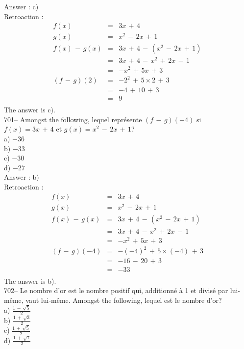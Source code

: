﻿\documentclass[letterpaper, 12pt]{article}
\begin{document}
Answer : c)\\

Retroaction : \\
\begin{eqnarray*}
f(x)&=&3x\,+\,4\\
g(x)&=&x^{2}\,-\,2x\,+\,1\\
f(x)\,-\,g(x)&=&3x\,+\,4\,-\,(x^{2}\,-\,2x\,+\,1)\\
&=&3x\,+\,4\,-\,x^{2}\,+\,2x\,-\,1\\
&=&-x^{2}\,+\,5x\,+\,3\\
(f\,-\,g)(2)&=& - 2^{2}\,+\,5\times2\,+\,3\\
&=&-4\,+\,10\,+\,3\\
&=&9\\
\end{eqnarray*}
The answer is c).\\

701-- Amongst the following, lequel repr\'esente $(f\,-\,g)(-4)$
si $f(x)=3x\,+\,4$ et $g(x)=x^{2}\,-\,2x\,+\,1$?\\
a) $-36$\\
b) $-33$\\
c) $-30$\\
d) $-27$\\

Answer : b)\\

Retroaction : \\
\begin{eqnarray*}
f(x)&=&3x\,+\,4\\
g(x)&=&x^{2}\,-\,2x\,+\,1\\
f(x)\,-\,g(x)&=&3x\,+\,4\,-\,(x^{2}\,-\,2x\,+\,1)\\
&=&3x\,+\,4\,-\,x^{2}\,+\,2x\,-\,1\\
&=&-x^{2}\,+\,5x\,+\,3\\
(f\,-\,g)(-4)&=& - (-4)^{2}\,+\,5\times(-4)\,+\,3\\
&=&-16\,-\,20\,+\,3\\
&=&-33\\
\end{eqnarray*}
The answer is b).\\

702-- Le nombre d'or est le nombre positif qui, additionn\'e \`a 1 et
divis\'e par lui-m\^eme, vaut lui-m\^eme.  Amongst the following,
lequel est le nombre d'or?\\
a) $\frac{1\,-\,\sqrt{5}}{2}$\\
b) $\frac{1\,+\,\sqrt{3}}{2}$\\
c) $\frac{1\,+\,\sqrt{5}}{2}$\\
d) $\frac{1\,+\,\sqrt{7}}{2}$\\
\end{document}
